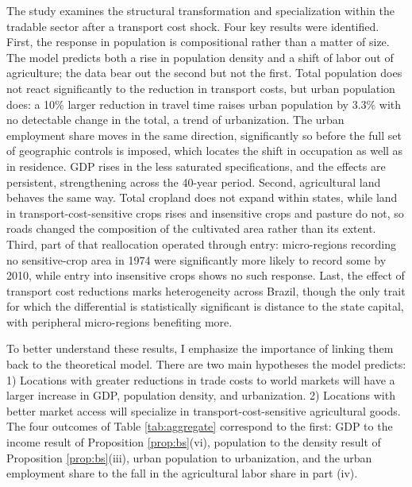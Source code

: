 \documentclass[11pt]{article}
\begin{document}
The study examines the structural transformation and specialization within the tradable sector after a transport cost shock. Four key results were identified. First, the response in population is compositional rather than a matter of size. The model predicts both a rise in population density and a shift of labor out of agriculture; the data bear out the second but not the first. Total population does not react significantly to the reduction in transport costs, but urban population does: a 10\% larger reduction in travel time raises urban population by 3.3\% with no detectable change in the total, a trend of urbanization. The urban employment share moves in the same direction, significantly so before the full set of geographic controls is imposed, which locates the shift in occupation as well as in residence. GDP rises in the less saturated specifications, and the effects are persistent, strengthening across the 40-year period. Second, agricultural land behaves the same way. Total cropland does not expand within states, while land in transport-cost-sensitive crops rises and insensitive crops and pasture do not, so roads changed the composition of the cultivated area rather than its extent. Third, part of that reallocation operated through entry: micro-regions recording no sensitive-crop area in 1974 were significantly more likely to record some by 2010, while entry into insensitive crops shows no such response. Last, the effect of transport cost reductions marks heterogeneity across Brazil, though the only trait for which the differential is statistically significant is distance to the state capital, with peripheral micro-regions benefiting more.

To better understand these results, I emphasize the importance of linking them back to the theoretical model. There are two main hypotheses the model predicts: 1) Locations with greater reductions in trade costs to world markets will have a larger increase in GDP, population density, and urbanization. 2) Locations with better market access will specialize in transport-cost-sensitive agricultural goods. The four outcomes of Table \ref{tab:aggregate} correspond to the first: GDP to the income result of Proposition \ref{prop:bs}(vi), population to the density result of Proposition \ref{prop:bs}(iii), urban population to urbanization, and the urban employment share to the fall in the agricultural labor share in part (iv). 
\end{document}
